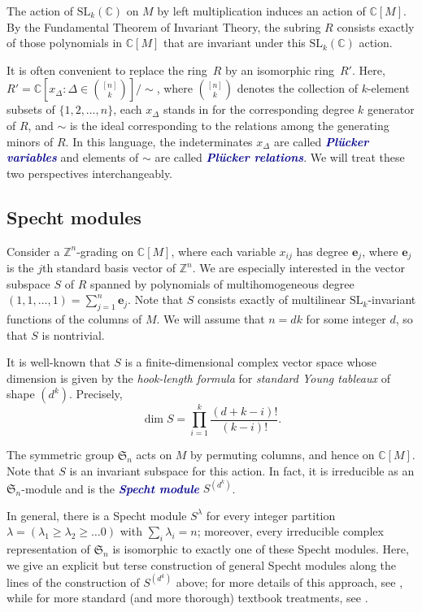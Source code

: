 \documentclass[ALCO, Unicode]{cedram}
\numberwithin{equation}{section}
\newcommand{\Z}{\mathbb Z}
\newcommand{\C}{\mathbb C}
\newcommand{\SL}{\mathrm{SL}}
\newcommand{\newword}[1]{\textcolor{darkblue}{\textbf{\emph{#1}}}}
\begin{document}
The action of $\SL_k(\C)$ on $M$ by left multiplication induces an action of $\C[M]$. By the Fundamental Theorem of Invariant Theory, the subring $R$ consists exactly of those polynomials in $\C[M]$ that are invariant under this $\SL_k(\C)$ action.

It is often convenient to replace the ring~$R$ by an isomorphic ring~$R'$. Here, $R' = \C[x_{\Delta} : \Delta \in \binom{[n]}{k}] / {\sim}$, where $\binom{[n]}{k}$ denotes the collection of $k$-element subsets of $\{1, 2, \dots, n\}$, each $x_\Delta$ stands in for the corresponding degree $k$ generator of $R$, and ${\sim}$ is the ideal corresponding to the relations among the generating minors of $R$. In this language, the indeterminates $x_\Delta$ are called \newword{Pl\"ucker variables} and elements of ${\sim}$ are called \newword{Pl\"ucker relations}. We will treat these two perspectives interchangeably. 

\subsection{Specht modules}
\label{sec:Spechtbackground}

Consider a $\Z^n$-grading on $\C[M]$, where each variable $x_{ij}$ has degree $\mathbf{e}_j$, where $\mathbf{e}_j$ is the $j$th standard basis vector of $\Z^n$. We are especially interested in the vector subspace $S$ of $R$ spanned by polynomials of multihomogeneous degree $(1,1, \dots, 1) = \sum_{j = 1}^n \mathbf{e}_j$. Note that $S$ consists exactly of multilinear $\SL_k$-invariant functions of the columns of $M$. We will assume that $n = dk$ for some integer $d$, so that $S$ is nontrivial.

It is well-known that $S$ is a finite-dimensional complex vector space whose dimension is given by the \emph{hook-length formula} for \emph{standard Young tableaux} of shape $(d^k)$. Precisely, 
\[
\dim S = \prod_{i=1}^{k} \frac{(d+k-i)!}{(k-i)!}.
\]

The symmetric group $\mathfrak{S}_n$ acts on $M$ by permuting columns, and hence on $\C[M]$. Note that $S$ is an invariant subspace for this action. In fact, it is irreducible as an $\mathfrak{S}_n$-module and is the \newword{Specht module} $S^{(d^k)}$.

In general, there is a Specht module $S^\lambda$ for every integer partition $\lambda = (\lambda_1 \geq \lambda_2 \geq \dots 0)$ with $\sum_i \lambda_i = n$; moreover, every irreducible complex representation of $\mathfrak{S}_n$ is isomorphic to exactly one of these Specht modules. Here, we give an explicit but terse construction of general Specht modules along the lines of the construction of $S^{(d^k)}$ above; for more details of this approach, see \cite[\S2.3]{Patrias.Pechenik.Striker}, while for more standard (and more thorough) textbook treatments, see \eg \cite{Fulton.Harris,Fulton:YoungTableaux,Sagan}. 
\end{document}
